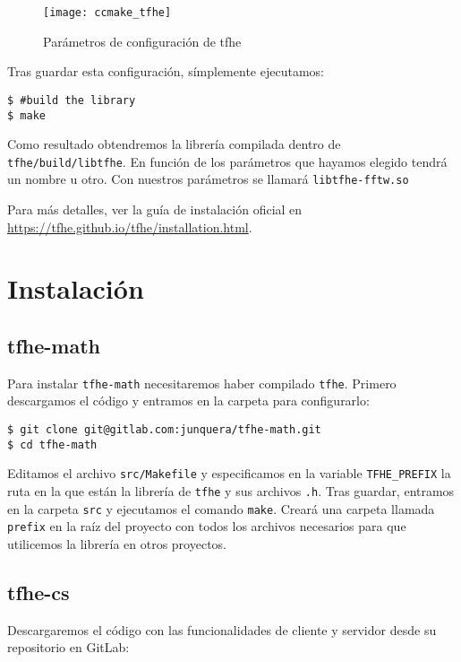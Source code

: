 \begin{figure}[h]
    \texttt{[image: ccmake\_tfhe]}
    \caption{Parámetros de configuración de tfhe}
    \label{fig:ccmake_tfhe}
\end{figure}

Tras guardar esta configuración, símplemente ejecutamos:

\begin{verbatim}
$ #build the library
$ make
\end{verbatim}

Como resultado obtendremos la librería compilada dentro de \verb|tfhe/build/libtfhe|. En función de los parámetros que hayamos elegido tendrá un nombre u otro. Con nuestros parámetros se llamará \verb|libtfhe-fftw.so|

Para más detalles, ver la guía de instalación oficial en \url{https://tfhe.github.io/tfhe/installation.html}.

\section{Instalación}

\subsection{tfhe-math}

Para instalar \verb|tfhe-math| necesitaremos haber compilado \verb|tfhe|. Primero descargamos el código y entramos en la carpeta para configurarlo:

\begin{verbatim}
$ git clone git@gitlab.com:junquera/tfhe-math.git
$ cd tfhe-math
\end{verbatim}

Editamos el archivo \verb|src/Makefile| y especificamos en la variable \verb|TFHE_PREFIX| la ruta en la que están la librería de \verb|tfhe| y sus archivos \verb|.h|. Tras guardar, entramos en la carpeta \verb|src| y ejecutamos el comando \verb|make|. Creará una carpeta llamada \verb|prefix| en la raíz del proyecto con todos los archivos necesarios para que utilicemos la librería en otros proyectos.

\subsection{tfhe-cs}

Descargaremos el código con las funcionalidades de cliente y servidor desde su repositorio en GitLab:

